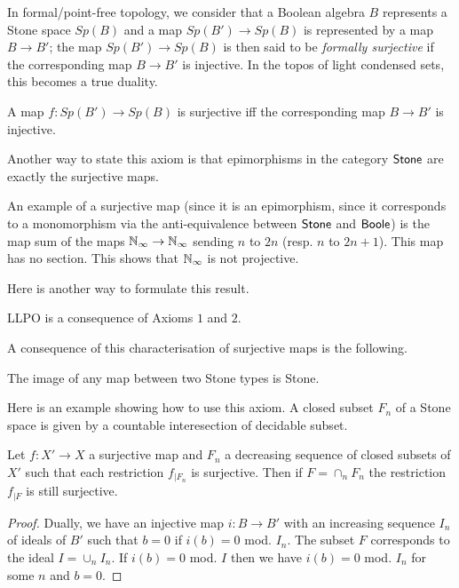 \medskip

In formal/point-free topology, we consider that a Boolean algebra $B$ represents a Stone space $Sp(B)$ and a map
$Sp(B') \to Sp(B)$ is represented by a map $B\rightarrow B'$; the map $Sp(B')\to Sp(B)$ is then said to be
{\em formally surjective} if the corresponding map $B\to B'$ is injective. In the topos of light condensed sets,
this becomes a true duality.

\begin{axiom}
  A map $f:Sp(B')\to Sp(B)$ is surjective iff the corresponding map $B \to B'$ is injective.
\end{axiom} 

Another way to state this axiom is that epimorphisms in the category $\mathsf{Stone}$ are exactly the surjective maps.

\medskip

An example of a surjective map (since it is an epimorphism, since it corresponds to a monomorphism via the anti-equivalence
between $\mathsf{Stone}$ and $\mathsf{Boole}$) is the map sum of the maps $\mathbb{N}_{\infty}\rightarrow \mathbb{N}_{\infty}$ sending $n$ to $2n$ (resp. $n$ to $2n+1$).
This map has no section. This shows that $\mathbb{N}_{\infty}$ is not projective.

Here is another way to formulate this result.

\begin{proposition}
  LLPO is a consequence of Axioms $1$ and $2$.
\end{proposition}

A consequence of this characterisation of surjective maps is the following.

\begin{proposition}
  The image of any map between two Stone types is Stone.
\end{proposition}

Here is an example showing how to use this axiom. A closed subset $F_n$ of a Stone space is given by a countable
interesection of decidable subset.

\begin{proposition}
  Let $f:X'\rightarrow X$ a surjective map and $F_n$ a decreasing sequence of closed subsets of $X'$ such that
  each restriction $f_{|F_n}$ is surjective. Then if $F = \cap_n F_n$ the restriction $f_{|F}$ is still surjective.
\end{proposition}

\begin{proof}
  Dually, we have an injective map $i:B\rightarrow B'$ with an increasing sequence $I_n$ of ideals of $B'$ such that
  $b = 0$ if $i(b) = 0$ mod. $I_n$. The subset $F$ corresponds to the ideal $I = \cup_n I_n$. If $i(b) = 0$ mod. $I$
  then we have $i(b) = 0$ mod. $I_n$ for some $n$ and $b = 0$. 
\end{proof}





